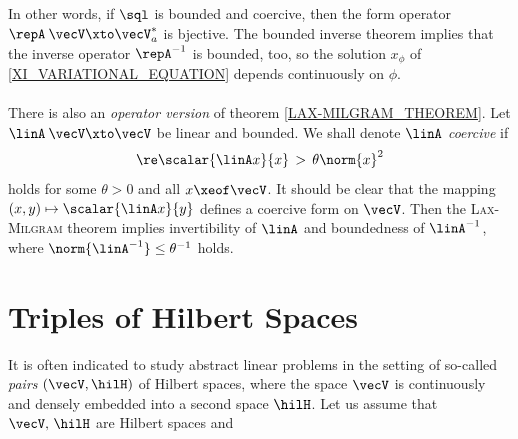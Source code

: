 \documentclass[11pt,twoside]{article}
\begin{document}
\subparagraph{}
In other words,
if $\sql$ is bounded and coercive,
then the form operator $\repA\: \vecV \xto \vecV_a^*$ is bjective.
The bounded inverse theorem implies
that the inverse operator $\repA^{-1}$ is bounded,
too,
so the solution $x_{\phi}$ of \eqref{XI_VARIATIONAL_EQUATION}
depends continuously on $\phi$.

\paragraph{} %
There is also an \textit{operator version} of theorem \ref{LAX-MILGRAM_THEOREM}.
Let $\linA\:\vecV \xto \vecV$ be linear and bounded.
We shall denote $\linA$ \textit{coercive} if
\[
\re \scalar{\linA x}{x} \, > \, \theta \norm{x}^2
\]
holds for some $\theta > 0$ and all $x \xeof \vecV$.
It should be clear
that the mapping $(x,y) \mapsto \scalar{\linA x}{y}$
defines a coercive form on $\vecV$.
Then the \textsc{Lax-Milgram} theorem implies
invertibility of $\linA$ and boundedness of $\linA^{-1}$,
where $\norm{\linA^{-1}} \leq \theta^{-1}$ holds.

\section{Triples of Hilbert Spaces}
It is often indicated to study abstract linear problems
in the setting of so-called \textit{pairs} $(\vecV,\hilH)$ of Hilbert spaces,
where the space $\vecV$ is continuously and densely embedded
into a second space $\hilH$.
Let us assume that $\vecV,\,\hilH$ are Hilbert spaces and
\end{document}
